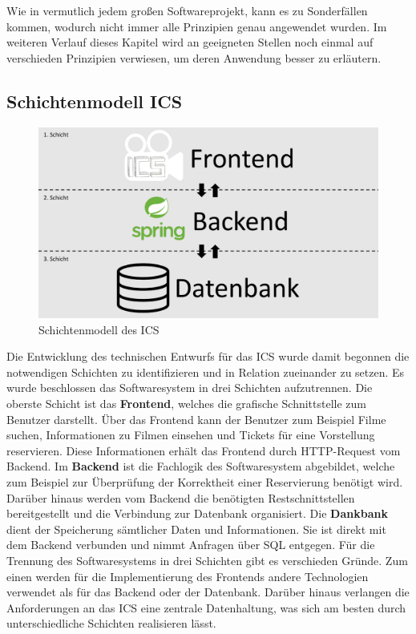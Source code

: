 		Wie in vermutlich jedem großen Softwareprojekt, kann es zu Sonderfällen kommen, wodurch nicht immer alle Prinzipien genau angewendet wurden. Im weiteren Verlauf dieses Kapitel wird an geeigneten Stellen noch einmal auf verschieden Prinzipien verwiesen, um deren Anwendung besser zu erläutern.
		\subsection{Schichtenmodell ICS}
		\begin{figure}[H]
			\centering 
			\includegraphics[width=14cm]{img/Schichtenmodell_ICS.pdf}
			\captionsetup{format=hang}
			\caption[Klassendiagramm]{\label{fig:Schichtenmodell} Schichtenmodell des ICS }
		\end{figure}
		Die Entwicklung des technischen Entwurfs für das \ac{ICS} wurde damit begonnen die notwendigen Schichten zu identifizieren und in Relation zueinander zu setzen. Es wurde beschlossen das Softwaresystem in drei Schichten aufzutrennen. 
		Die oberste Schicht ist das \glqq \textbf{Frontend}\grqq{}, welches die grafische Schnittstelle zum Benutzer darstellt. Über das Frontend kann der Benutzer zum Beispiel Filme suchen, Informationen zu Filmen einsehen und Tickets für eine Vorstellung reservieren. Diese Informationen erhält das Frontend durch HTTP-Request vom Backend.
		Im \glqq \textbf{Backend}\grqq{} ist die Fachlogik des Softwaresystem abgebildet, welche zum Beispiel zur Überprüfung der Korrektheit einer Reservierung benötigt wird. Darüber hinaus werden vom Backend die benötigten Restschnittstellen bereitgestellt und die Verbindung zur Datenbank organisiert. 
		Die \textbf{Dankbank} dient der Speicherung sämtlicher Daten und Informationen. Sie ist direkt mit dem Backend verbunden und nimmt Anfragen über SQL entgegen. 
		Für die Trennung des Softwaresystems in drei Schichten gibt es verschieden Gründe. Zum einen werden für die Implementierung des Frontends andere Technologien verwendet als für das Backend oder der Datenbank. Darüber hinaus verlangen die Anforderungen an das \ac{ICS} eine zentrale Datenhaltung, was sich am besten durch unterschiedliche Schichten realisieren lässt.
